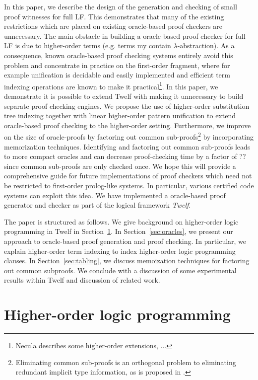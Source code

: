\documentclass{acmconf}
\begin{document}
In this paper, we describe the design of the generation and checking
of small proof witnesses for full LF. This demonstrates that many of
the existing restrictions which are placed on existing oracle-based proof checkers
are unnecessary. The main obstacle in building a oracle-based proof checker for full LF
is due to higher-order terms (e.g. terms my contain
$\lambda$-abstraction). As a consequence, known oracle-based proof checking
systems entirely avoid this problem and concentrate in
practice on the first-order 
fragment, where for example unification is decidable and easily
implemented and efficient term indexing operations are known to make
it practical\footnote{Necula describes some higher-order extensions,
  ...}. In this paper, we demonstrate it is possible to extend
Twelf with making it unnecessary to build separate proof checking
engines. 
We propose the use of higher-order substitution tree indexing together
with linear higher-order pattern unification to extend oracle-based
proof checking to the higher-order setting. Furthermore, we improve on
the size of oracle-proofs by factoring out common
sub-proofs\footnote{Eliminating common sub-proofs is an orthogonal
  problem to eliminating redundant implicit type 
  information, as is   proposed in \cite{Necula98lics}.} by
incorporating memorization techniques. Identifying and factoring out
common sub-proofs leads to more compact oracles and can  
decrease proof-checking time by a factor of ?? since common sub-proofs
are only checked once.  We hope this will provide a comprehensive
guide for future implementations of proof checkers which need not be
restricted to first-order prolog-like systems. In particular, various
certified code systems can exploit this idea. We have implemented 
a oracle-based proof generator and checker as part of the logical
framework {\em Twelf}.  

The paper is structured as follows. We give background on
higher-order logic programming in Twelf in Section~\ref{sec:twelf}. In
Section~\ref{sec:oracles}, we present our approach to oracle-based
proof generation and proof checking. In particular, we explain
higher-order term indexing to index higher-order logic programming
clauses. In Section~\ref{sec:tabling}, we discuss memoization techniques for
factoring out common subproofs. We conclude with a discussion of some
experimental results within Twelf and discussion of related work.

\section{Higher-order logic programming}\label{sec:twelf}
\end{document}
